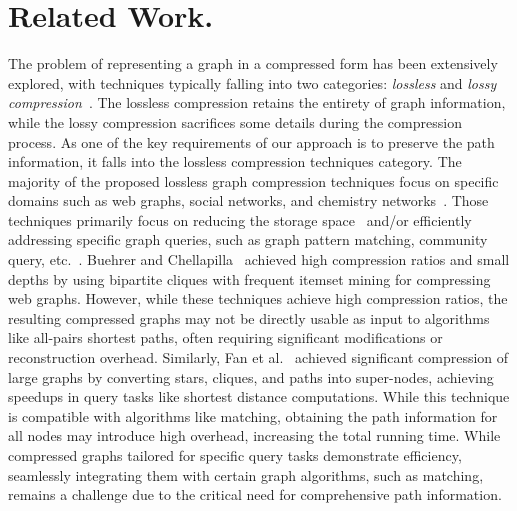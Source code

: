 \section{Related Work.}
\label{sec:related_works}
The problem of representing a graph in a compressed form has been extensively explored,
with techniques typically falling into two categories: \emph{lossless} and \emph{lossy compression}~\cite{besta2019survey}. The lossless compression retains the entirety of graph information, while the lossy compression sacrifices some details during the compression process. As one of the key requirements of our approach is to preserve the path information, it falls into the lossless compression techniques category. The majority of the proposed lossless graph compression techniques focus on specific domains such as web graphs, social networks, and chemistry networks~\cite{besta2019survey}. Those techniques primarily focus on reducing the storage space~\cite{danisch2023compressing} and/or efficiently addressing specific graph queries, such as graph pattern matching, community query, etc.~\cite{DAG_compression, scalable_compression, compressing_bisection, lossless_contraction, gZip}. Buehrer and Chellapilla~\cite{scalable_compression} achieved high compression ratios and small depths by using bipartite cliques with frequent itemset mining for compressing web graphs. However, while these techniques achieve high compression ratios, the resulting compressed graphs may not be directly usable as input to algorithms like all-pairs shortest paths, often requiring significant modifications or reconstruction overhead. Similarly, Fan et al.~\cite{lossless_contraction} achieved significant compression of large graphs by converting stars, cliques, and paths into super-nodes, achieving speedups in query tasks like shortest distance computations. While this technique is compatible with algorithms like matching, obtaining the path information for all nodes may introduce high overhead, increasing the total running time. While compressed graphs tailored for specific query tasks demonstrate efficiency, seamlessly integrating them with certain graph algorithms, such as matching, remains a challenge due to the critical need for comprehensive path information. 



